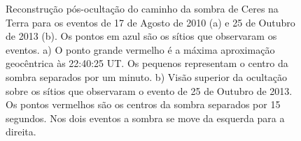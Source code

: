 \documentclass[12pt,a4paper]{monografia}
\begin{document}
\begin{figure}[h]
\begin{centering}
\caption{Reconstrução pós-ocultação do caminho da sombra de Ceres na Terra para os eventos de 17 de Agosto de 2010 (a) e 25 de Outubro de 2013 (b). Os pontos em azul são os sítios que observaram os eventos. a) O ponto grande vermelho é a máxima aproximação geocêntrica às 22:40:25 UT. Os pequenos representam o centro da sombra separados por um minuto. b) Visão superior da ocultação sobre os sítios que observaram o evento de 25 de Outubro de 2013. Os pontos vermelhos são os centros da sombra separados por 15 segundos. Nos dois eventos a sombra se move da esquerda para a direita.
\label{Fig: Ceres-map}}
\end{centering}
\end{figure}
\end{document}
